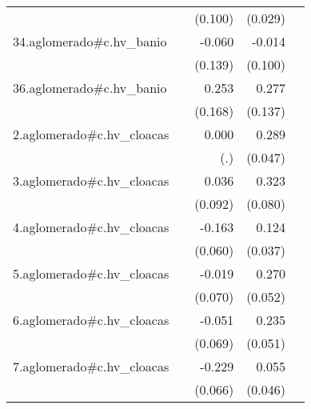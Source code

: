 {\begin{longtable}{l*{4}{D{.}{.}{-1}}}
            &                     &     (0.100)         &     (0.029)         &                     \\
\addlinespace
34.aglomerado#c.hv\_banio&                     &      -0.060         &      -0.014         &                     \\
            &                     &     (0.139)         &     (0.100)         &                     \\
\addlinespace
36.aglomerado#c.hv\_banio&                     &       0.253         &       0.277\sym{*}  &                     \\
            &                     &     (0.168)         &     (0.137)         &                     \\
\addlinespace
2.aglomerado#c.hv\_cloacas&                     &       0.000         &       0.289\sym{***}&                     \\
            &                     &         (.)         &     (0.047)         &                     \\
\addlinespace
3.aglomerado#c.hv\_cloacas&                     &       0.036         &       0.323\sym{***}&                     \\
            &                     &     (0.092)         &     (0.080)         &                     \\
\addlinespace
4.aglomerado#c.hv\_cloacas&                     &      -0.163\sym{**} &       0.124\sym{***}&                     \\
            &                     &     (0.060)         &     (0.037)         &                     \\
\addlinespace
5.aglomerado#c.hv\_cloacas&                     &      -0.019         &       0.270\sym{***}&                     \\
            &                     &     (0.070)         &     (0.052)         &                     \\
\addlinespace
6.aglomerado#c.hv\_cloacas&                     &      -0.051         &       0.235\sym{***}&                     \\
            &                     &     (0.069)         &     (0.051)         &                     \\
\addlinespace
7.aglomerado#c.hv\_cloacas&                     &      -0.229\sym{***}&       0.055         &                     \\
            &                     &     (0.066)         &     (0.046)         &                     \\

\end{longtable}}
